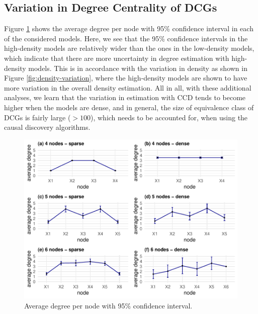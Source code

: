 \documentclass[
]{article}
\begin{document}
\hypertarget{variation-in-degree-centrality-of-dcgs}{%
\subsection{Variation in Degree Centrality of DCGs}\label{variation-in-degree-centrality-of-dcgs}}

\noindent Figure \ref{fig:deg-variation} shows the average degree per node with 95\% confidence interval in each of the considered models. Here, we see that the 95\% confidence intervals in the high-density models are relatively wider than the ones in the low-density models, which indicate that there are more uncertainty in degree estimation with high-density models. This is in accordance with the variation in density as shown in Figure \ref{fig:density-variation}, where the high-density models are shown to have more variation in the overall density estimation. All in all, with these additional analyses, we learn that the variation in estimation with CCD tends to become higher when the models are dense, and in general, the size of equivalence class of DCGs is fairly large (\(>100\)), which needs to be accounted for, when using the causal discovery algorithms.

\vspace{0.5cm}

\begin{figure}

{\centering \includegraphics[width=0.9\linewidth]{img/deg_variation} 

}

\caption{Average degree per node with 95\% confidence interval.}\label{fig:deg-variation}
\end{figure}
\end{document}
